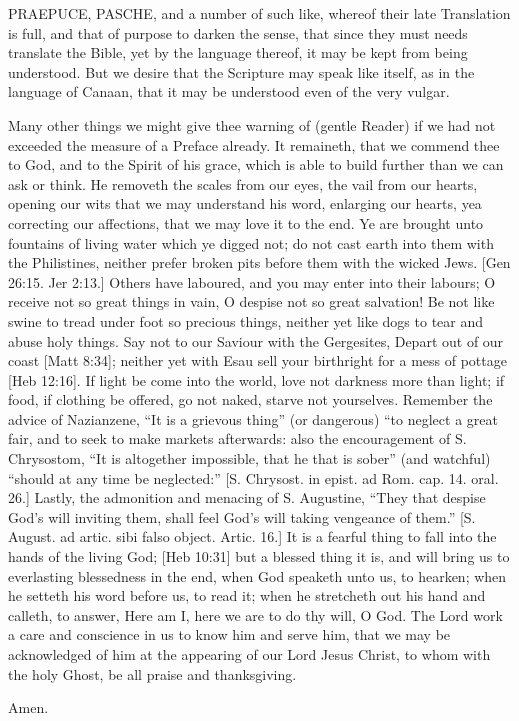 {PRAEPUCE, PASCHE, and a number of such like, whereof their late Translation is full, and that of purpose to darken the sense, that since they must needs translate the Bible, yet by the language thereof, it may be kept from being understood. But we desire that the Scripture may speak like itself, as in the language of Canaan, that it may be understood even of the very vulgar.
\par }{\IP Many other things we might give thee warning of (gentle Reader) if we had not exceeded the measure of a Preface already. It remaineth, that we commend thee to God, and to the Spirit of his grace, which is able to build further than we can ask or think. He removeth the scales from our eyes, the vail from our hearts, opening our wits that we may understand his word, enlarging our hearts, yea correcting our affections, that we may love it to the end. Ye are brought unto fountains of living water which ye digged not; do not cast earth into them with the Philistines, neither prefer broken pits before them with the wicked Jews. [Gen 26:15. Jer 2:13.] Others have laboured, and you may enter into their labours; O receive not so great things in vain, O despise not so great salvation! Be not like swine to tread under foot so precious things, neither yet like dogs to tear and abuse holy things. Say not to our Saviour with the Gergesites, Depart out of our coast [Matt 8:34]; neither yet with Esau sell your birthright for a mess of pottage [Heb 12:16]. If light be come into the world, love not darkness more than light; if food, if clothing be offered, go not naked, starve not yourselves. Remember the advice of Nazianzene, “It is a grievous thing” (or dangerous) “to neglect a great fair, and to seek to make markets afterwards: also the encouragement of S. Chrysostom, “It is altogether impossible, that he that is sober” (and watchful) “should at any time be neglected:” [S. Chrysost. in epist. ad Rom. cap. 14. oral. 26.] Lastly, the admonition and menacing of S. Augustine, “They that despise God’s will inviting them, shall feel God’s will taking vengeance of them.” [S. August. ad artic. sibi falso object. Artic. 16.] It is a fearful thing to fall into the hands of the living God; [Heb 10:31] but a blessed thing it is, and will bring us to everlasting blessedness in the end, when God speaketh unto us, to hearken; when he setteth his word before us, to read it; when he stretcheth out his hand and calleth, to answer, Here am I, here we are to do thy will, O God. The Lord work a care and conscience in us to know him and serve him, that we may be acknowledged of him at the appearing of our Lord Jesus Christ, to whom with the holy Ghost, be all praise and thanksgiving.
\par }{\IP Amen.

\par }